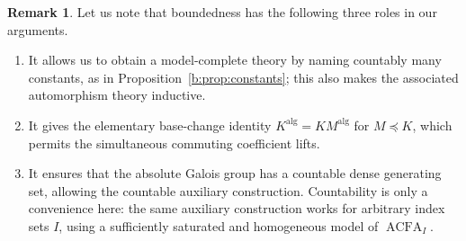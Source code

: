 \documentclass[11pt,a4paper]{amsart}
\theoremstyle{definition}
\newtheorem{remark}[theorem]{Remark}
\newcommand{\alg}{\mathrm{alg}}
\begin{document}
\begin{remark}
Let us note that boundedness has the following three roles in our arguments.
\begin{enumerate}
  \item It allows
us to obtain a model-complete theory by naming countably many
constants, as in Proposition~\ref{b:prop:constants}; this also makes
the associated automorphism theory inductive.

  \item It gives
the elementary base-change identity $K^{\alg}=KM^{\alg}$ for
$M\preccurlyeq K$, which permits the simultaneous commuting
coefficient lifts.

  \item It ensures that the absolute Galois
group has a countable dense generating set, allowing the
countable auxiliary construction. Countability is only a convenience here: the same auxiliary
construction works for arbitrary index sets $I$, using a sufficiently
saturated and homogeneous model of $\operatorname{ACFA}_I$.
\end{enumerate}
\end{remark}
\end{document}
